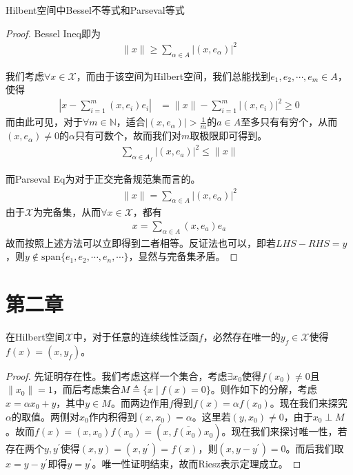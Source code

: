 \begin{theorem}
    Hilbent空间中Bessel不等式和Parseval等式
\end{theorem}
\begin{proof}
    Bessel Ineq即为
    \begin{align*}
        \|x\| \geqslant \sum\limits_{\alpha\in A} \left|(x,e_{\alpha})\right|^2
    \end{align*}

    我们考虑$\forall x\in\mathscr{X}$，而由于该空间为Hilbert空间，我们总能找到$e_1,e_2,\cdots,e_m\in A$，使得
    \begin{align*}
        \left|x - \sum\limits_{i=1}^m (x,e_i)e_i \right| & = \|x\| - \sum\limits_{i=1}^m |(x,e_i)|^2 \geqslant 0
    \end{align*}
    而由此可见，对于$\forall m\in\mathbb{N}$，适合$|(x,e_{\alpha})| > \frac{1}{m}$的$a\in A$至多只有有穷个，从而$(x,e_{\alpha}) \neq 0$的$\alpha$只有可数个，故而我们对$m$取极限即可得到。
    \begin{align*}
        \sum\limits_{\alpha\in A_f} |(x,e_a)|^2 \leqslant \|x\|
    \end{align*}

    而Parseval Eq为对于正交完备规范集而言的。
    \begin{align*}
        \|x\| = \sum\limits_{\alpha\in A} \left|(x,e_{\alpha})\right|^2
    \end{align*}
    由于$\mathscr{X}$为完备集，从而$\forall x\in\mathscr{X}$，都有
    \begin{align*}
        x = \sum\limits_{\alpha\in A} (x,e_a)e_a 
    \end{align*}
    故而按照上述方法可以立即得到二者相等。反证法也可以，即若$LHS - RHS = y$，则$y\notin\text{span}\{e_1,e_2,\cdots,e_n,\cdots\}$，显然与完备集矛盾。
\end{proof}

\section{第二章}
\begin{theorem}[Riesz表示定理]
    在Hilbert空间$\mathscr{X}$中，对于任意的连续线性泛函$f$，必然存在唯一的$y_f\in \mathscr{X}$使得$f(x) = (x,y_f)$。
\end{theorem}
\begin{proof}
    先证明存在性。我们考虑这样一个集合，考虑$\exists x_0$使得$f(x_0)\neq 0$且$\|x_0\| = 1$，而后考虑集合$M \triangleq \{x\mid f(x) = 0\}$。则作如下的分解，考虑$x = \alpha x_0 + y$，其中$y \in M$。而两边作用$f$得到$f(x) = \alpha f(x_0)$。现在我们来探究$\alpha$的取值。两侧对$x_0$作内积得到$(x,x_0) = \alpha$。这里若$(y,x_0)\neq 0$，由于$x_0\perp M$。故而$f(x) = (x,x_0)f(x_0) = (x, \overline{f(x_0)}x_0)$。现在我们来探讨唯一性，若存在两个$y,y^{\prime}$使得$(x,y) = (x,y^{\prime}) = f(x)$，则$(x,y-y^{\prime})=0$。而后我们取$x = y - y^{\prime}$即得$y = y^{\prime}$。唯一性证明结束，故而Riesz表示定理成立。
\end{proof}

